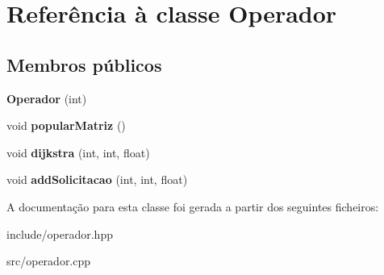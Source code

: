\hypertarget{classOperador}{}\section{Referência à classe Operador}
\label{classOperador}
\subsection*{Membros públicos}
\begin{DoxyCompactItemize}
\item 
\mbox{\label{classOperador_aadb83847d75fc2c42690b384783cfb5a}} 
{\bfseries Operador} (int)
\item 
\mbox{\label{classOperador_afd389b87b447dca493463f235783a9b9}} 
void {\bfseries popular\+Matriz} ()
\item 
\mbox{\label{classOperador_a24322d0c556dfee49114855bf1f90865}} 
void {\bfseries dijkstra} (int, int, float)
\item 
\mbox{\label{classOperador_ad27031c62c430782dd240cdc3aa574ce}} 
void {\bfseries add\+Solicitacao} (int, int, float)
\end{DoxyCompactItemize}


A documentação para esta classe foi gerada a partir dos seguintes ficheiros\+:\begin{DoxyCompactItemize}
\item 
include/operador.\+hpp\item 
src/operador.\+cpp\end{DoxyCompactItemize}
